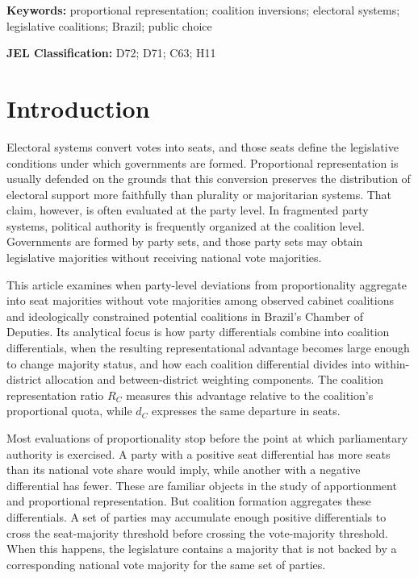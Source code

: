\documentclass[11pt]{article}
\begin{document}
\noindent\textbf{Keywords:} proportional representation; coalition inversions; electoral systems; legislative coalitions; Brazil; public choice

\noindent\textbf{JEL Classification:} D72; D71; C63; H11




\section{Introduction}

Electoral systems convert votes into seats, and those seats define the legislative conditions under which governments are formed. Proportional representation is usually defended on the grounds that this conversion preserves the distribution of electoral support more faithfully than plurality or majoritarian systems. That claim, however, is often evaluated at the party level. In fragmented party systems, political authority is frequently organized at the coalition level. Governments are formed by party sets, and those party sets may obtain legislative majorities without receiving national vote majorities.

This article examines when party-level deviations from proportionality aggregate
into seat majorities without vote majorities among observed cabinet coalitions
and ideologically constrained potential coalitions in Brazil’s Chamber of
Deputies. Its analytical focus is how party differentials combine into
coalition differentials, when the resulting representational advantage becomes
large enough to change majority status, and how each coalition differential
divides into within-district allocation and between-district weighting
components. The coalition representation ratio \(R_C\) measures this advantage
relative to the coalition's proportional quota, while \(d_C\) expresses the
same departure in seats.

Most evaluations of proportionality stop before the point at which parliamentary
authority is exercised. A party with a positive seat differential has more seats
than its national vote share would imply, while another with a negative
differential has fewer. These are familiar objects in the study of apportionment
and proportional representation. But coalition formation aggregates these
differentials. A set of parties may accumulate enough positive differentials to
cross the seat-majority threshold before crossing the vote-majority threshold.
When this happens, the legislature contains a majority that is not backed by a
corresponding national vote majority for the same set of parties.
\end{document}
